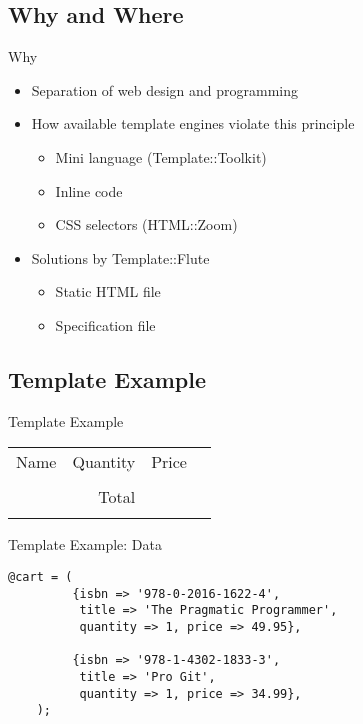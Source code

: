 \subsection{Why and Where}
\begin{frame}{Why}
  \begin{itemize}
  \item Separation of web design and programming
  \item How available template engines violate this principle
    \begin{itemize}
    \item Mini language (Template::Toolkit)
    \item Inline code
    \item CSS selectors (HTML::Zoom)
    \end{itemize}
  \item Solutions by Template::Flute
    \begin{itemize}
      \item Static HTML file
      \item Specification file
    \end{itemize}
  \end{itemize}
\end{frame}


\subsection{Template Example}
\begin{frame}{Template Example}
\begin{tabular}[t]{rrrr}
\hfill Name & Quantity & Price \\
\hfill & & \\
\hfill & Total & \\
\hfill & & \\
\end{tabular}
\end{frame}

\begin{frame}[fragile]{Template Example: Data}
\begin{lstlisting}
@cart = (
         {isbn => '978-0-2016-1622-4', 
          title => 'The Pragmatic Programmer',
          quantity => 1, price => 49.95},

         {isbn => '978-1-4302-1833-3',
          title => 'Pro Git',
          quantity => 1, price => 34.99},
	);
\end{lstlisting}
\end{frame}

